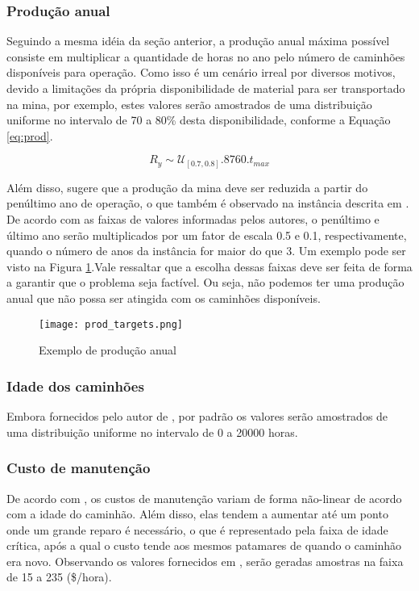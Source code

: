 \documentclass[conference]{IEEEtran}
\begin{document}
\subsubsection{Produção anual}
Seguindo a mesma idéia da seção anterior, a produção anual máxima possível consiste em multiplicar a quantidade de horas no ano pelo número de caminhões disponíveis para operação. Como isso é um cenário irreal por diversos motivos, devido a limitações da própria disponibilidade de material para ser transportado na mina, por exemplo, estes valores serão amostrados de uma distribuição uniforme no intervalo de 70 a 80\% desta disponibilidade, conforme a Equação \ref{eq:prod}. 

\begin{equation}
	R_y \sim \mathcal{U}_{[0.7, 0.8]}. 8760. t_{max}
	\label{eq:prod}
\end{equation}

Além disso, \cite{nakousi2018} sugere que a produção da mina deve ser reduzida a partir do penúltimo ano de operação, o que também é observado na instância descrita em \cite{topal2010a}. De acordo com as faixas de valores informadas pelos autores, o penúltimo e último ano serão multiplicados por um fator de escala 0.5 e 0.1, respectivamente, quando o número de anos da instância for maior do que 3. Um exemplo pode ser visto na Figura \ref{fig:prod_targets}.Vale ressaltar que a escolha dessas faixas deve ser feita de forma a garantir que o problema seja factível. Ou seja, não podemos ter uma produção anual que não possa ser atingida com os caminhões disponíveis.

\begin{figure}[h!]
	\centering
	\texttt{[image: prod\_targets.png]}
	\caption{Exemplo de produção anual}
	\label{fig:prod_targets}
\end{figure}




\subsubsection{Idade dos caminhões}
Embora fornecidos pelo autor de \cite{topal2010a}, por padrão os valores serão amostrados de uma distribuição uniforme no intervalo de 0 a 20000 horas.

\subsubsection{Custo de manutenção}
De acordo com \cite{nakousi2018}, os custos de manutenção variam de forma não-linear de acordo com a idade do caminhão. Além disso, elas tendem a aumentar até um ponto onde um grande reparo é necessário, o que é representado pela faixa de idade crítica, após a qual o custo tende aos mesmos patamares de quando o caminhão era novo. Observando os valores fornecidos em \cite{topal2010a, topal2010b}, serão geradas amostras na faixa de 15 a 235 (\$/hora).
\end{document}
